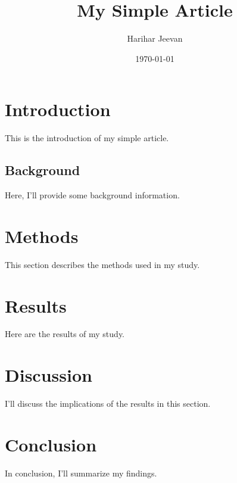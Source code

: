 \documentclass{article}
\title{My Simple Article}
\author{Harihar Jeevan}
\date{\today}
\begin{document}
	\maketitle
	\section{Introduction}
		This is the introduction of my simple article.
	\subsection{Background}
	Here, I'll provide some background information.
	\section{Methods}
	This section describes the methods used in my study.
	\section{Results}
	Here are the results of my study.
	\section{Discussion}
	I'll discuss the implications of the results in this section.
	\section{Conclusion}
	In conclusion, I'll summarize my findings.
\end{document}
